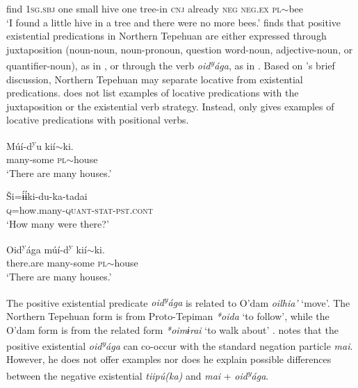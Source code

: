 \documentclass[output=paper,draft,draftmode,colorlinks,citecolor=brown]{langscibook}
\begin{document}
find	\textsc{1sg.sbj}	one	small	hive	one	tree-in		\textsc{cnj}	already		\textsc{neg}	\textsc{neg.ex}	\textsc{pl}$\sim$bee\\
\glt ‘I found a little hive in a tree and there were no more bees.’ \citep[15]{bascomm1998}
\z 
\citet{bascom1982} finds that positive existential predications in Northern Tepehuan are either expressed through juxtaposition (noun-noun, noun-pronoun, question word-noun, adjective-noun, or quantifier-noun), as in , or through the verb \emph{oid\textsuperscript{y}ága}, as in . Based on \citet{bascom1982}'s brief discussion, Northern Tepehuan may separate locative from existential predications. \citet{bascom1982} does not list examples of locative predications with the juxtaposition or the existential verb strategy. Instead, \citet{bascom1982} only gives examples of locative predications with positional verbs.
\ea
\label{ex:odam-juxta}
\begin{xlist}
\item\gll Múí-d\textsuperscript{y}u kií$\sim$ki.\\
many-some \textsc{pl}$\sim$house\\
\glt `There are many houses.' \citep[281]{bascom1982}
\item\gll Ši=ɨ́ɨ́ki-du-ka-tadai\\
\textsc{q}=how.many-\textsc{quant-stat-pst.cont}\\
\glt `How many were there?' \citep[282]{bascom1982}
\end{xlist}
\z 
\ea
\label{ex:odam-oidag}
\begin{xlist}
\item\gll Oid\textsuperscript{y}ága múí-d\textsuperscript{y} kií$\sim$ki.\\
there.are many-some \textsc{pl}$\sim$house\\
\glt `There are many houses.' \citep[282]{bascom1982}
\end{xlist}
\z
The positive existential predicate \emph{oid\textsuperscript{y}ága} is related to O'dam \emph{oilhia'} `move'. The Northern Tepehuan form is from Proto-Tepiman \emph{*oida} `to follow', while the O'dam form is from the related form \emph{*oimɨrai} `to walk about' \citep{hill2014}. \citet[281]{bascom1982} notes that the positive existential \emph{oid\textsuperscript{y}ága} can co-occur with the standard negation particle \emph{mai}. However, he does not offer examples nor does he explain possible differences between the negative existential \emph{tiipú(ka)} and \emph{mai} + \emph{oid\textsuperscript{y}ága}.
\end{document}

